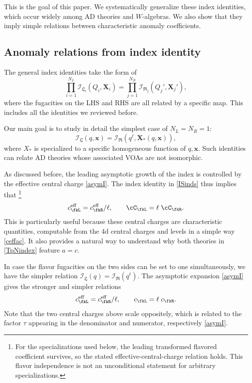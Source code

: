 \documentclass[a4paper,11pt]{article}
\theoremstyle{definition}
\theoremstyle{definition}
\theoremstyle{remark}
\newcommand{\ceff}{c^\text{eff}}
\newcommand{\be}{\begin{equation}}
\newcommand{\ee}{\end{equation}}
\begin{document}
This is the goal of this paper. We systematically generalize these index identities, which
occur widely among AD theories and $W$-algebras. We also show that they imply simple
relations between characteristic anomaly coefficients.



 \subsection{Anomaly relations  from  index identity}
 
 The   general   index identities  take  the  form  of
 \be
\prod_{i=1}^{N_L}  {\mathcal{I}}_{\mathfrak{L}_i}(Q_i, \bm X_i)
=\prod_{j=1}^{N_R}  {\mathcal{I}}_{\mathfrak{R}_j}(Q_j',\bm X_j'),
 \ee
 where the fugacities on the LHS and RHS are all related by a specific  map. This   includes all the   identities we reviewed before.  
 
 
 Our main goal is to study in detail the simplest case of $N_L=N_R=1$:   
 \be\label{ISinds}
   {\mathcal{I}}_{\mathfrak{L} }(q,\bm x  )=  {\mathcal{I}}_{\mathfrak{R} }(q^\ell, \bm X _*(q,\bm x)),
 \ee
where $X_* $ is specialized to a specific  homogeneous function of $q, \bm x$. Such identities can relate AD theories whose
associated VOAs are not isomorphic.

As discussed before, the leading asymptotic growth of the index is controlled by the effective central charge  \eqref{asymI}. 
 The index identity in \eqref{ISinds} thus     implies that 
 \footnote{For the specializations used below, the leading transformed flavored coefficient survives, so the stated effective-central-charge relation holds. This flavor independence is not an unconditional statement for arbitrary specializations.  }
 \be\label{LRcc}
\ceff_\fkL=\ceff_\fkR/\ell, \qquad \cC_\fkL=\ell \; \cC_\fkR.
 \ee
  This is particularly useful because these   central charges  are characteristic quantities, computable from the  4d central charges and levels in a simple way \eqref{ceffac}.  It also provides a natural way to understand  why both theories in \eqref{TpNindex} feature $a=c$. 
 
  
  In case the flavor fugacities on the two sides can be set to one simultaneously, we have the  simpler relation $   {\mathcal{I}}_{\mathfrak{L} }(q  )=  {\mathcal{I}}_{\mathfrak{R} }(q^\ell)$. The asymptotic  expansion \eqref{asymI} gives  the   stronger and simpler relations   
  \be\label{ceffecL}
     \ceff_\fkL=\ceff_\fkR/\ell,\qquad
c_{\fkL}=\ell \; c_{\fkR} .
  \ee
Note that the  two central charges above scale oppositely, which is related to the factor $\tau$ appearing in the denominator and numerator, respectively  \eqref{asymI}. 
\end{document}
